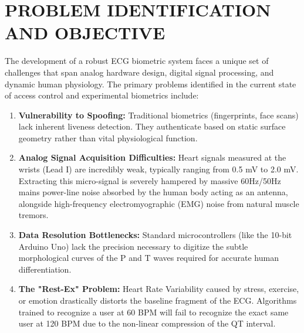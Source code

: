 \documentclass[12pt,a4paper]{report}
\begin{document}
\chapter{PROBLEM IDENTIFICATION AND OBJECTIVE}
\vspace{10pt}
The development of a robust ECG biometric system faces a unique set of challenges that span analog hardware design, digital signal processing, and dynamic human physiology. The primary problems identified in the current state of access control and experimental biometrics include:

\vspace{10pt}

\begin{enumerate}
\item \textbf{Vulnerability to Spoofing:} Traditional biometrics (fingerprints, face scans) lack inherent liveness detection. They authenticate based on static surface geometry rather than vital physiological function.
\item \textbf{Analog Signal Acquisition Difficulties:} Heart signals measured at the wrists (Lead I) are incredibly weak, typically ranging from 0.5 mV to 2.0 mV. Extracting this micro-signal is severely hampered by massive 60Hz/50Hz mains power-line noise absorbed by the human body acting as an antenna, alongside high-frequency electromyographic (EMG) noise from natural muscle tremors.
\item \textbf{Data Resolution Bottlenecks:} Standard microcontrollers (like the 10-bit Arduino Uno) lack the precision necessary to digitize the subtle morphological curves of the P and T waves required for accurate human differentiation.
\item \textbf{The "Rest-Ex" Problem:} Heart Rate Variability caused by stress, exercise, or emotion drastically distorts the baseline fragment of the ECG. Algorithms trained to recognize a user at 60 BPM will fail to recognize the exact same user at 120 BPM due to the non-linear compression of the QT interval. \\
\end{enumerate}

\newpage
\end{document}
